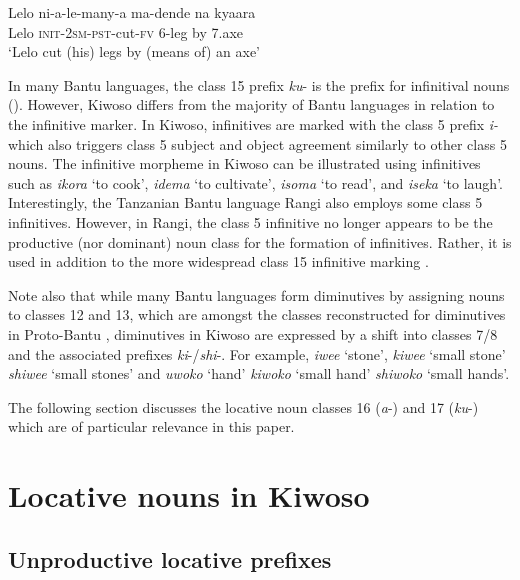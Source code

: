 \documentclass[output=paper]{langscibook}
\begin{document}
    \ex\label{ex:mallya:1b}
    \gll Lelo    ni-a-le-many-a      ma-dende    na    kyaara\\
         Lelo    \textsc{init}-2\textsc{sm}-\textsc{pst}-cut-\textsc{fv}    6-leg            by    7.axe\\
    \glt ‘Lelo cut (his) legs by (means of) an axe’
    \z
\z

In many Bantu languages, the class 15 prefix {\textit{ku}}{{}- is the prefix for infinitival nouns (\citealt{Katamba2003, VandeVelde2019}). However, Kiwoso differs from the majority of Bantu languages in relation to the infinitive marker. In Kiwoso, infinitives are marked with the class 5 prefix} {\textit{i-}} {which also triggers class 5 subject and object agreement similarly to other class 5 nouns. The} {infinitive morpheme in Kiwoso can be illustrated using infinitives such as} {\textit{ikora}} {‘to cook’,} {\textit{idema}} {‘to cultivate’,} {\textit{isoma}} {‘to read’, and} {\textit{iseka}} {‘to laugh’. Interestingly, the Tanzanian Bantu language Rangi also employs some class 5 infinitives. However, in Rangi, the class 5 infinitive no longer appears to be the productive (nor dominant) noun class for the formation of infinitives. Rather, it is used in addition to the more widespread class 15 infinitive marking \citep{Gibson2012}.}

\begin{sloppypar}
Note also that while many Bantu languages form diminutives by assigning nouns to classes 12 and 13, which are amongst the classes reconstructed for diminutives in Proto-Bantu \citep{Meeussen1967}, diminutives in Kiwoso are expressed by a shift into classes 7/8 and the associated prefixes \textit{ki}{}-/\textit{shi}{}-. For example, \textit{iwee} ‘stone’, \textit{kiwee} ‘small stone’ \textit{shiwee} ‘small stones’ and \textit{uwoko} ‘hand’ \textit{kiwoko} ‘small hand’ \textit{shiwoko} ‘small hands’.
\end{sloppypar}

The following section discusses the locative noun classes 16 (\textit{a}{}-) and 17 (\textit{ku}{}-) which are of particular relevance in this paper.

\section{Locative nouns in Kiwoso}
\label{sec:mallya:4}

\subsection{Unproductive locative prefixes}
\label{sec:mallya:4.1}
\end{document}
